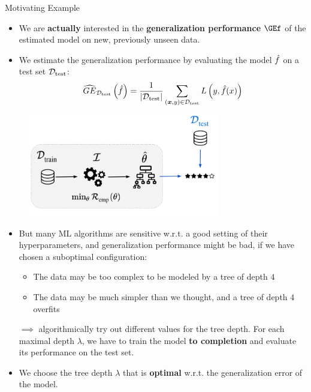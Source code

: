 \documentclass[11pt,compress,t,notes=noshow, xcolor=table]{beamer}
\begin{document}
\begin{vbframe}{Motivating Example}
\begin{itemize}
\item We are \textbf{actually} interested in the \textbf{generalization performance} $\GEf$ of the estimated model on new, previously unseen data. 
\item We estimate the generalization performance by evaluating the model $\hat{f}$ on a test set $\mathcal{D}_{\text{test}}$: $$
\widehat{GE}_{\mathcal{D}_{\text{test}}}\left(\hat{f}\right) = \frac{1}{|\mathcal{D}_{\text{test}}|} \sum\limits_{(\bm{x}, y) \in \mathcal{D}_{\text{test}}} L\left(y, \hat{f}(x) \right)
$$
\end{itemize}
\vspace*{-0.6cm}
\begin{center}
\begin{figure}
\includegraphics[width=0.75\textwidth]{figure_man/riskmin_bilevel2.png}
\end{figure}
\end{center}

\framebreak 

\begin{itemize}
\item But many ML algorithms are sensitive w.r.t. a good setting of their hyperparameters,
  and generalization performance might be bad, if we have chosen a suboptimal configuration:
\begin{itemize}
\item The data may be too complex to be modeled by a tree of depth $4$ 
\item The data may be much simpler than we thought, and a tree of depth $4$ overfits
\end{itemize}
\item[$\implies$] algorithmically try out different values for the tree depth. For each maximal depth $\lambda$, we have to train the model \textbf{to completion} and evaluate its performance on the test set. 
\item We choose the tree depth $\lambda$ that is \textbf{optimal} w.r.t. the generalization error of the model. 
\end{itemize}


\end{vbframe}
\end{document}
